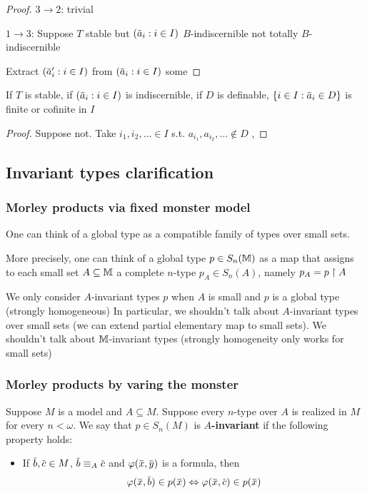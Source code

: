 \documentclass[11pt]{article}
\begin{document}
\begin{proof}
\(3\to 2\): trivial

\(1\to 3\): Suppose \(T\) stable but \((\bara_i:i\in I)\) \(B\)-indiscernible not
totally \(B\)-indiscernible

Extract \((\bara_i':i\in I)\) from \((\bara_i:i\in I)\) some
\end{proof}

\begin{corollary}[]
If \(T\) is stable, if \((\bara_i:i\in I)\) is indiscernible, if \(D\) is
definable, \(\{i\in I:\bara_i\in D\}\) is finite or cofinite in \(I\)
\end{corollary}

\begin{proof}
Suppose not. Take \(i_1,i_2,\dots\in I\) s.t. \(a_{i_1},a_{i_2},\dots\notin D\) , 
\end{proof}

\subsection{Invariant types clarification}
\label{sec:orgf760134}
\subsubsection{Morley products via fixed monster model}
\label{sec:orgcbd191f}
\begin{remark}
One can think of a global type as a compatible family of types over small sets.

More precisely, one can think of a global type \(p\in S_n(\mathbb{M})\) as a map that assigns to each small
set \(A\subseteq\mathbb{M}\) a complete \(n\)-type \(p_A\in S_n(A)\), namely \(p_A=p\upharpoonright A\)
\end{remark}

\begin{warning}
We only consider \(A\)-invariant types \(p\) when \(A\) is small and \(p\) is a global type
(strongly homogeneous) In particular, we shouldn't talk about \(A\)-invariant types over small
sets (we can extend partial elementary map to small sets). We shouldn't talk
about \(\mathbb{M}\)-invariant types (strongly homogeneity only works for small sets)
\end{warning}
\subsubsection{Morley products by varing the monster}
\label{sec:org7f85237}
\begin{definition}[]
\label{itc10}
Suppose \(M\) is a model and \(A\subseteq M\). Suppose every \(n\)-type over \(A\) is realized in \(M\)
for every \(n<\omega\). We say that \(p\in S_n(M)\) is \textbf{\(A\)-invariant} if the following property holds:
\begin{itemize}
\item If \(\barb,\barc\in M\), \(\barb\equiv_A\barc\) and \(\varphi(\barx,\bary)\) is a formula, then
\begin{equation*}
\varphi(\barx,\barb)\in p(\barx)\Leftrightarrow\varphi(\barx,\barc)\in p(\barx)
\end{equation*}
\end{itemize}
\end{definition}
\end{document}
